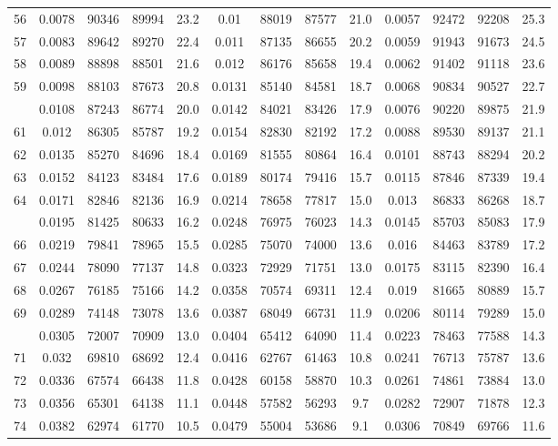 \documentclass[
  14pt,
]{article}
\begin{document}
\begin{longtable}[t]{lcccccccccccc}
56 & 0.0078 & 90346 & 89994 & 23.2 & 0.01 & 88019 & 87577 & 21.0 & 0.0057 & 92472 & 92208 & 25.3\\
57 & 0.0083 & 89642 & 89270 & 22.4 & 0.011 & 87135 & 86655 & 20.2 & 0.0059 & 91943 & 91673 & 24.5\\
58 & 0.0089 & 88898 & 88501 & 21.6 & 0.012 & 86176 & 85658 & 19.4 & 0.0062 & 91402 & 91118 & 23.6\\
59 & 0.0098 & 88103 & 87673 & 20.8 & 0.0131 & 85140 & 84581 & 18.7 & 0.0068 & 90834 & 90527 & 22.7\\
\addlinespace
60 & 0.0108 & 87243 & 86774 & 20.0 & 0.0142 & 84021 & 83426 & 17.9 & 0.0076 & 90220 & 89875 & 21.9\\
61 & 0.012 & 86305 & 85787 & 19.2 & 0.0154 & 82830 & 82192 & 17.2 & 0.0088 & 89530 & 89137 & 21.1\\
62 & 0.0135 & 85270 & 84696 & 18.4 & 0.0169 & 81555 & 80864 & 16.4 & 0.0101 & 88743 & 88294 & 20.2\\
63 & 0.0152 & 84123 & 83484 & 17.6 & 0.0189 & 80174 & 79416 & 15.7 & 0.0115 & 87846 & 87339 & 19.4\\
64 & 0.0171 & 82846 & 82136 & 16.9 & 0.0214 & 78658 & 77817 & 15.0 & 0.013 & 86833 & 86268 & 18.7\\
\addlinespace
65 & 0.0195 & 81425 & 80633 & 16.2 & 0.0248 & 76975 & 76023 & 14.3 & 0.0145 & 85703 & 85083 & 17.9\\
66 & 0.0219 & 79841 & 78965 & 15.5 & 0.0285 & 75070 & 74000 & 13.6 & 0.016 & 84463 & 83789 & 17.2\\
67 & 0.0244 & 78090 & 77137 & 14.8 & 0.0323 & 72929 & 71751 & 13.0 & 0.0175 & 83115 & 82390 & 16.4\\
68 & 0.0267 & 76185 & 75166 & 14.2 & 0.0358 & 70574 & 69311 & 12.4 & 0.019 & 81665 & 80889 & 15.7\\
69 & 0.0289 & 74148 & 73078 & 13.6 & 0.0387 & 68049 & 66731 & 11.9 & 0.0206 & 80114 & 79289 & 15.0\\
\addlinespace
70 & 0.0305 & 72007 & 70909 & 13.0 & 0.0404 & 65412 & 64090 & 11.4 & 0.0223 & 78463 & 77588 & 14.3\\
71 & 0.032 & 69810 & 68692 & 12.4 & 0.0416 & 62767 & 61463 & 10.8 & 0.0241 & 76713 & 75787 & 13.6\\
72 & 0.0336 & 67574 & 66438 & 11.8 & 0.0428 & 60158 & 58870 & 10.3 & 0.0261 & 74861 & 73884 & 13.0\\
73 & 0.0356 & 65301 & 64138 & 11.1 & 0.0448 & 57582 & 56293 & 9.7 & 0.0282 & 72907 & 71878 & 12.3\\
74 & 0.0382 & 62974 & 61770 & 10.5 & 0.0479 & 55004 & 53686 & 9.1 & 0.0306 & 70849 & 69766 & 11.6\\

\end{longtable}
\end{document}

